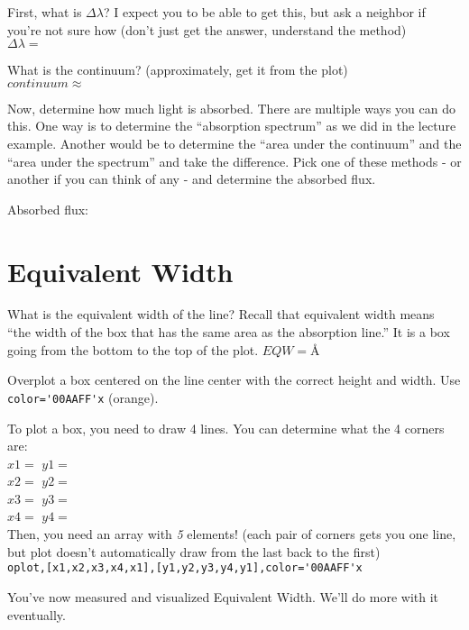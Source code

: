 \documentclass{article}
\begin{document}
\begin{spacing}{1.0}
First, what is $\Delta \lambda$?  I expect you to be able to get this, but ask a
neighbor if you're not sure how (don't just get the answer, understand the
method)\\
$\Delta \lambda=$\underline{\hspace{3cm}}

What is the continuum?  (approximately, get it from the plot) \\
$continuum\approx$\underline{\hspace{3cm}}

Now, determine how much light is absorbed.  There are multiple ways you can do
this.  One way is to determine the ``absorption spectrum'' as we did in the
lecture example.  Another would be to determine the ``area under the continuum''
and the ``area under the spectrum'' and take the difference.  
Pick one of these methods - or another if you can think of any - and determine the
absorbed flux.

Absorbed flux: \underline{\hspace{3cm}}

\section{Equivalent Width}
What is the equivalent width of the line?  Recall that equivalent width means
``the width of the box that has the same area as the absorption line.''  It is
a box going from the bottom to the top of the plot.
$EQW=$\underline{\hspace{3cm}}\AA

Overplot a box centered on the line center with the correct height and width.
Use \verb|color='00AAFF'x| (orange).

To plot a box, you need to draw 4 lines.  You can determine what the 4 corners are:\\
$x1=$\underline{\hspace{3cm}}  $y1=$\underline{\hspace{3cm}} \\
$x2=$\underline{\hspace{3cm}}  $y2=$\underline{\hspace{3cm}} \\
$x3=$\underline{\hspace{3cm}}  $y3=$\underline{\hspace{3cm}} \\
$x4=$\underline{\hspace{3cm}}  $y4=$\underline{\hspace{3cm}} \\

Then, you need an array with \emph{5} elements!  (each pair of corners gets you one line, but plot
doesn't automatically draw from the last back to the first)\\
\verb|oplot,[x1,x2,x3,x4,x1],[y1,y2,y3,y4,y1],color='00AAFF'x|

You've now measured and visualized Equivalent Width.  We'll do more with it eventually.

\end{spacing}
\end{document}
